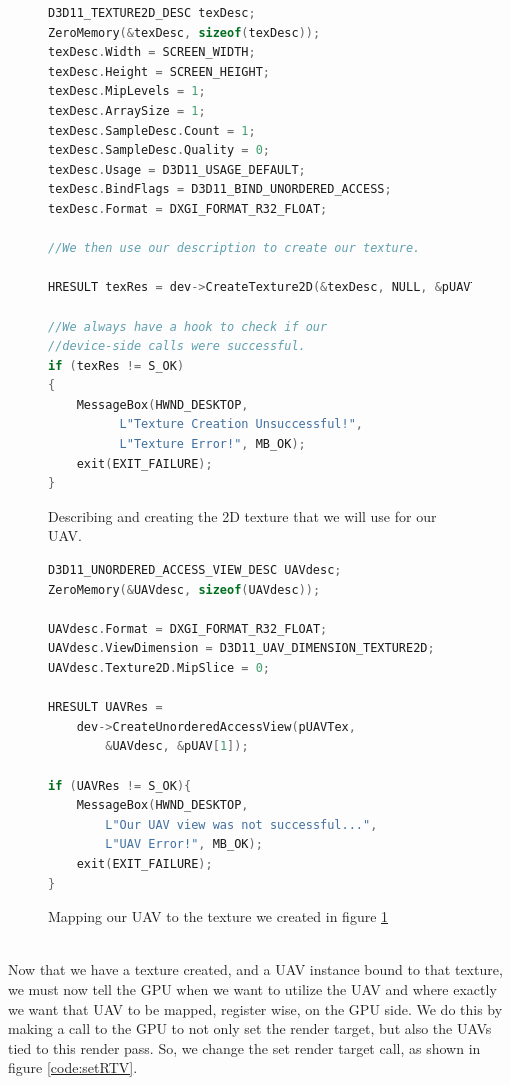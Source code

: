 \documentclass[a4paper, 12pt]{article}
\begin{document}
\begin{figure}[h]
\begin{lstlisting}[language=C++,breaklines=true]
D3D11_TEXTURE2D_DESC texDesc;
ZeroMemory(&texDesc, sizeof(texDesc));
texDesc.Width = SCREEN_WIDTH;
texDesc.Height = SCREEN_HEIGHT;
texDesc.MipLevels = 1;
texDesc.ArraySize = 1;
texDesc.SampleDesc.Count = 1;
texDesc.SampleDesc.Quality = 0;
texDesc.Usage = D3D11_USAGE_DEFAULT;
texDesc.BindFlags = D3D11_BIND_UNORDERED_ACCESS;
texDesc.Format = DXGI_FORMAT_R32_FLOAT;

//We then use our description to create our texture.

HRESULT texRes = dev->CreateTexture2D(&texDesc, NULL, &pUAVTex);

//We always have a hook to check if our 
//device-side calls were successful.
if (texRes != S_OK)
{
	MessageBox(HWND_DESKTOP, 
		  L"Texture Creation Unsuccessful!", 
		  L"Texture Error!", MB_OK);
	exit(EXIT_FAILURE);
}

\end{lstlisting}
\caption{Describing and creating the 2D texture that we will use for our UAV.}
\label{code:texDesc}
\end{figure}


\begin{figure}[h]
\begin{lstlisting}[language=C++]
D3D11_UNORDERED_ACCESS_VIEW_DESC UAVdesc;
ZeroMemory(&UAVdesc, sizeof(UAVdesc));

UAVdesc.Format = DXGI_FORMAT_R32_FLOAT;
UAVdesc.ViewDimension = D3D11_UAV_DIMENSION_TEXTURE2D;
UAVdesc.Texture2D.MipSlice = 0;

HRESULT UAVRes = 
	dev->CreateUnorderedAccessView(pUAVTex, 
		&UAVdesc, &pUAV[1]);

if (UAVRes != S_OK){
	MessageBox(HWND_DESKTOP, 
		L"Our UAV view was not successful...", 
		L"UAV Error!", MB_OK);
	exit(EXIT_FAILURE);
}
\end{lstlisting}
\caption{Mapping our UAV to the texture we created in figure \ref{code:texDesc}}
\label{code:mapUAVtoTex}
\end{figure}

\noindent \\ Now that we have a texture created, and a UAV instance bound
to that texture, we must now tell the GPU when we want to utilize the UAV and
where exactly we want that UAV to be mapped, register wise, on the GPU side.
We do this by making a call to the GPU to not only set the render target, but
also the UAVs tied to this render pass. So, we change the set render target
call, as shown in figure \ref{code:setRTV}.
\end{document}
